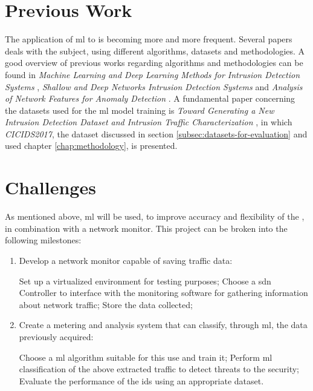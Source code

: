 
\section{Previous Work}
\label{sec:prev-work}

The application of \gls{ml} to  is becoming more and more frequent. Several papers deals with the subject, using different algorithms, datasets and methodologies. A good overview of previous works regarding algorithms and methodologies can be found in \textit{Machine Learning and Deep Learning Methods for Intrusion Detection Systems} \cite{Liu2019}, \textit{Shallow and Deep Networks Intrusion Detection Systems} \cite{Hodo2017} and \textit{Analysis of Network Features for Anomaly Detection} \cite{Iglesias2015}. A fundamental paper concerning the datasets used for the \gls{ml} model training is \textit{Toward Generating a New Intrusion Detection Dataset and Intrusion Traffic Characterization} \cite{icissp17}, in which \textit{CICIDS2017}, the dataset discussed in section \ref{subsec:datasets-for-evaluation} and used chapter \ref{chap:methodology}, is presented. 


\section{Challenges}
\label{sec:objectives}

As mentioned above, \gls{ml} will be used, to improve accuracy and flexibility of the , in combination with a network monitor. This project can be broken into the following milestones:

\begin{enumerate}
    \item Develop a network monitor capable of saving traffic data:
    \begin{itemize}
        \itemAR Set up a virtualized environment for testing purposes;
        \itemAR Choose a \gls{sdn} Controller to interface with the monitoring software for gathering information about network traffic;
        \itemAR Store the data collected;
    \end{itemize}
    \item Create a metering and analysis system that can classify, through \gls{ml}, the data previously acquired:
    \begin{itemize}
        \itemAR Choose a \gls{ml} algorithm suitable for this use and train it;
        \itemAR Perform \gls{ml} classification of the above extracted traffic to detect threats to the security;
        \itemAR Evaluate the performance of the \gls{ids} using an appropriate dataset.
    \end{itemize}
\end{enumerate}

